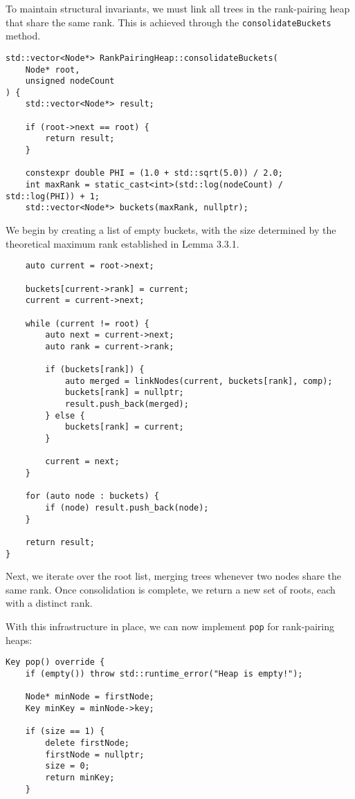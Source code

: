 To maintain structural invariants, we must link all trees in the rank-pairing heap that share the same rank. This is achieved through the \texttt{consolidateBuckets} method.

\begin{verbatim}
std::vector<Node*> RankPairingHeap::consolidateBuckets(
    Node* root,
    unsigned nodeCount
) {
    std::vector<Node*> result;
    
    if (root->next == root) {
        return result;
    }
    
    constexpr double PHI = (1.0 + std::sqrt(5.0)) / 2.0;
    int maxRank = static_cast<int>(std::log(nodeCount) / std::log(PHI)) + 1;
    std::vector<Node*> buckets(maxRank, nullptr);
\end{verbatim}

We begin by creating a list of empty buckets, with the size determined by the theoretical maximum rank established in Lemma 3.3.1.

\begin{verbatim}
    auto current = root->next;
    
    buckets[current->rank] = current;
    current = current->next;
    
    while (current != root) {
        auto next = current->next;
        auto rank = current->rank;
        
        if (buckets[rank]) {
            auto merged = linkNodes(current, buckets[rank], comp);
            buckets[rank] = nullptr;
            result.push_back(merged);
        } else {
            buckets[rank] = current;
        }
        
        current = next;
    }
    
    for (auto node : buckets) {
        if (node) result.push_back(node);
    }
    
    return result;
}
\end{verbatim}

Next, we iterate over the root list, merging trees whenever two nodes share the same rank. Once consolidation is complete, we return a new set of roots, each with a distinct rank.

With this infrastructure in place, we can now implement \texttt{pop} for rank-pairing heaps:

\begin{verbatim}
Key pop() override {
    if (empty()) throw std::runtime_error("Heap is empty!");

    Node* minNode = firstNode;
    Key minKey = minNode->key;

    if (size == 1) {
        delete firstNode;
        firstNode = nullptr;
        size = 0;
        return minKey;
    }

\end{verbatim}

